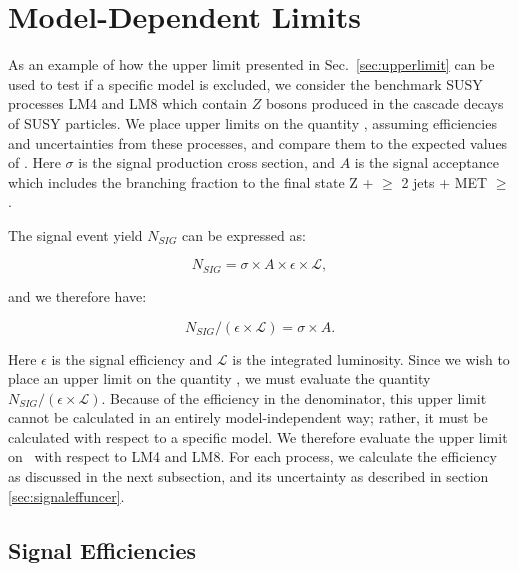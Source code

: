 
\section{Model-Dependent Limits}
\label{sec:models}

As an example of how the upper limit presented in Sec.~\ref{sec:upperlimit} can be
used to test if a specific model is excluded, we consider the benchmark
SUSY processes LM4 and LM8 which contain
$Z$ bosons produced in the cascade decays of SUSY particles. 
We place upper limits on the quantity \sta,
assuming efficiencies and uncertainties from these processes, and compare them to 
the expected values of \sta.
Here $\sigma$ is the signal production cross section, %
and $A$ is the signal acceptance which includes the branching fraction to the final state Z + $\ge$ 2 jets + MET $\ge$ \signalmett.

The signal event yield $N_{SIG}$ can be expressed as:

\begin{equation}
N_{SIG} = \sigma \times A \times \epsilon \times \mathcal{L},
\end{equation}

and we therefore have:

\begin{equation}
N_{SIG}/( \epsilon \times \mathcal{L}) = \sigma \times A.
\end{equation}

Here  $\epsilon$ is the signal efficiency and $\mathcal{L}$ is the integrated luminosity. 
Since we wish to place an upper limit on the quantity %
\sta, we must evaluate
the quantity $N_{SIG}/(\epsilon \times \mathcal{L})$.  Because of the efficiency
in the denominator, this upper limit cannot be calculated in an entirely model-independent
way; rather, it must be calculated with respect to a specific model. We therefore evaluate
the upper limit on %
\sta\
with respect to LM4 and LM8.  
For each process, we calculate the efficiency as discussed
in the next subsection, and
its uncertainty as described in section \ref{sec:signaleffuncer}.


\subsection{Signal Efficiencies}
\label{sec:sigeff}

